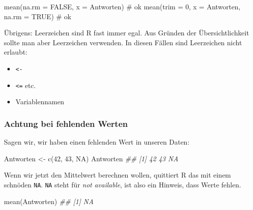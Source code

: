 \documentclass[
  a4paper,
  DIV=11]{scrreprt}
\newenvironment{Shaded}{\begin{snugshade}}{\end{snugshade}}
\newcommand{\AttributeTok}[1]{\textcolor[rgb]{0.40,0.45,0.13}{#1}}
\newcommand{\CommentTok}[1]{\textcolor[rgb]{0.37,0.37,0.37}{#1}}
\newcommand{\ConstantTok}[1]{\textcolor[rgb]{0.56,0.35,0.01}{#1}}
\newcommand{\DecValTok}[1]{\textcolor[rgb]{0.68,0.00,0.00}{#1}}
\newcommand{\DocumentationTok}[1]{\textcolor[rgb]{0.37,0.37,0.37}{\textit{#1}}}
\newcommand{\FunctionTok}[1]{\textcolor[rgb]{0.28,0.35,0.67}{#1}}
\newcommand{\NormalTok}[1]{\textcolor[rgb]{0.00,0.23,0.31}{#1}}
\newcommand{\OtherTok}[1]{\textcolor[rgb]{0.00,0.23,0.31}{#1}}
\providecommand{\tightlist}{%
  \setlength{\itemsep}{0pt}\setlength{\parskip}{0pt}}\usepackage{longtable,booktabs,array}
\theoremstyle{definition}
\theoremstyle{definition}
\theoremstyle{definition}
\theoremstyle{remark}
\begin{document}
\begin{Shaded}
\begin{Highlighting}[]
\FunctionTok{mean}\NormalTok{(}\AttributeTok{na.rm =} \ConstantTok{FALSE}\NormalTok{, }\AttributeTok{x =}\NormalTok{ Antworten)  }\CommentTok{\# ok}
\FunctionTok{mean}\NormalTok{(}\AttributeTok{trim =} \DecValTok{0}\NormalTok{, }\AttributeTok{x =}\NormalTok{ Antworten, }\AttributeTok{na.rm =} \ConstantTok{TRUE}\NormalTok{)  }\CommentTok{\# ok}
\end{Highlighting}
\end{Shaded}

Übrigens: Leerzeichen sind R fast immer egal. Aus Gründen der
Übersichtlichkeit sollte man aber Leerzeichen verwenden. In diesen
Fällen sind Leerzeichen nicht erlaubt:

\begin{itemize}
\tightlist
\item
  \texttt{\textless{}-}
\item
  \texttt{\textless{}=} etc.
\item
  Variablennamen
\end{itemize}

\subsubsection{Achtung bei fehlenden
Werten}\label{achtung-bei-fehlenden-werten}

Sagen wir, wir haben einen fehlenden Wert in unseren Daten:

\begin{Shaded}
\begin{Highlighting}[]
\NormalTok{Antworten }\OtherTok{\textless{}{-}} \FunctionTok{c}\NormalTok{(}\DecValTok{42}\NormalTok{, }\DecValTok{43}\NormalTok{, }\ConstantTok{NA}\NormalTok{)}
\NormalTok{Antworten}
\DocumentationTok{\#\# [1] 42 43 NA}
\end{Highlighting}
\end{Shaded}

Wenn wir jetzt den Mittelwert berechnen wollen, quittiert R das mit
einem schnöden \texttt{NA}. \texttt{NA} steht für \emph{not available},
ist also ein Hinweis, dass Werte fehlen.

\begin{Shaded}
\begin{Highlighting}[]
\FunctionTok{mean}\NormalTok{(Antworten)}
\DocumentationTok{\#\# [1] NA}
\end{Highlighting}
\end{Shaded}
\end{document}
